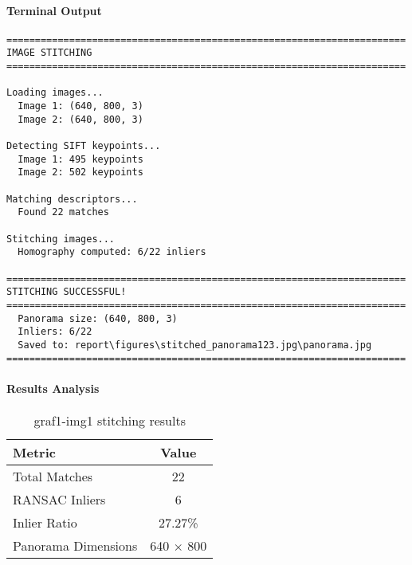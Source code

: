 \documentclass[12pt,a4paper]{article}
\begin{document}
\paragraph{Terminal Output}
\begin{lstlisting}
======================================================================
IMAGE STITCHING
======================================================================

Loading images...
  Image 1: (640, 800, 3)
  Image 2: (640, 800, 3)

Detecting SIFT keypoints...
  Image 1: 495 keypoints
  Image 2: 502 keypoints

Matching descriptors...
  Found 22 matches

Stitching images...
  Homography computed: 6/22 inliers

======================================================================
STITCHING SUCCESSFUL!
======================================================================
  Panorama size: (640, 800, 3)
  Inliers: 6/22
  Saved to: report\figures\stitched_panorama123.jpg\panorama.jpg
======================================================================
\end{lstlisting}

\paragraph{Results Analysis}
\begin{table}[H]
\centering
\begin{tabular}{@{}lc@{}}
\toprule
\textbf{Metric} & \textbf{Value} \\
\midrule
Total Matches & 22 \\
RANSAC Inliers & 6 \\
Inlier Ratio & 27.27\% \\
Panorama Dimensions & 640 $\times$ 800 \\
\bottomrule
\end{tabular}
\caption{graf1-img1 stitching results}
\end{table}
\end{document}
